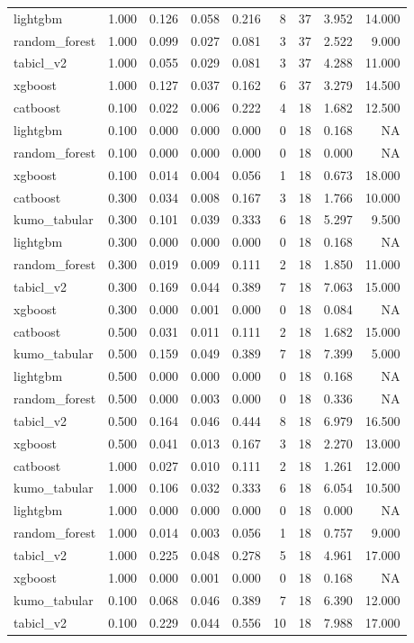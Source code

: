 \begin{table}
\begin{tabular}{lrrrrrrrr}
lightgbm & 1.000 & 0.126 & 0.058 & 0.216 & 8 & 37 & 3.952 & 14.000 \\
random\_forest & 1.000 & 0.099 & 0.027 & 0.081 & 3 & 37 & 2.522 & 9.000 \\
tabicl\_v2 & 1.000 & 0.055 & 0.029 & 0.081 & 3 & 37 & 4.288 & 11.000 \\
xgboost & 1.000 & 0.127 & 0.037 & 0.162 & 6 & 37 & 3.279 & 14.500 \\
catboost & 0.100 & 0.022 & 0.006 & 0.222 & 4 & 18 & 1.682 & 12.500 \\
lightgbm & 0.100 & 0.000 & 0.000 & 0.000 & 0 & 18 & 0.168 & NA \\
random\_forest & 0.100 & 0.000 & 0.000 & 0.000 & 0 & 18 & 0.000 & NA \\
xgboost & 0.100 & 0.014 & 0.004 & 0.056 & 1 & 18 & 0.673 & 18.000 \\
catboost & 0.300 & 0.034 & 0.008 & 0.167 & 3 & 18 & 1.766 & 10.000 \\
kumo\_tabular & 0.300 & 0.101 & 0.039 & 0.333 & 6 & 18 & 5.297 & 9.500 \\
lightgbm & 0.300 & 0.000 & 0.000 & 0.000 & 0 & 18 & 0.168 & NA \\
random\_forest & 0.300 & 0.019 & 0.009 & 0.111 & 2 & 18 & 1.850 & 11.000 \\
tabicl\_v2 & 0.300 & 0.169 & 0.044 & 0.389 & 7 & 18 & 7.063 & 15.000 \\
xgboost & 0.300 & 0.000 & 0.001 & 0.000 & 0 & 18 & 0.084 & NA \\
catboost & 0.500 & 0.031 & 0.011 & 0.111 & 2 & 18 & 1.682 & 15.000 \\
kumo\_tabular & 0.500 & 0.159 & 0.049 & 0.389 & 7 & 18 & 7.399 & 5.000 \\
lightgbm & 0.500 & 0.000 & 0.000 & 0.000 & 0 & 18 & 0.168 & NA \\
random\_forest & 0.500 & 0.000 & 0.003 & 0.000 & 0 & 18 & 0.336 & NA \\
tabicl\_v2 & 0.500 & 0.164 & 0.046 & 0.444 & 8 & 18 & 6.979 & 16.500 \\
xgboost & 0.500 & 0.041 & 0.013 & 0.167 & 3 & 18 & 2.270 & 13.000 \\
catboost & 1.000 & 0.027 & 0.010 & 0.111 & 2 & 18 & 1.261 & 12.000 \\
kumo\_tabular & 1.000 & 0.106 & 0.032 & 0.333 & 6 & 18 & 6.054 & 10.500 \\
lightgbm & 1.000 & 0.000 & 0.000 & 0.000 & 0 & 18 & 0.000 & NA \\
random\_forest & 1.000 & 0.014 & 0.003 & 0.056 & 1 & 18 & 0.757 & 9.000 \\
tabicl\_v2 & 1.000 & 0.225 & 0.048 & 0.278 & 5 & 18 & 4.961 & 17.000 \\
xgboost & 1.000 & 0.000 & 0.001 & 0.000 & 0 & 18 & 0.168 & NA \\
kumo\_tabular & 0.100 & 0.068 & 0.046 & 0.389 & 7 & 18 & 6.390 & 12.000 \\
tabicl\_v2 & 0.100 & 0.229 & 0.044 & 0.556 & 10 & 18 & 7.988 & 17.000 \\
\bottomrule
\end{tabular}
\end{table}
